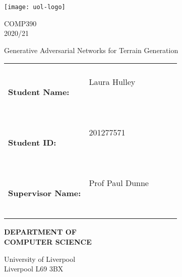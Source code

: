 \begin{titlepage}
    \begin{center}
        \texttt{[image: uol-logo]}

        \vspace{5em}

        \Large{COMP390}
        \vspace{1em}
        \Large{\\2020/21}

        \vspace{3em}

        \Large{Generative Adversarial Networks for Terrain Generation}

        \vspace{3em}

        \begin{tabular}{|lp{5.0cm}lll|}
            \hline
                                      &                    &  &   & \\
            \textbf{Student Name:}    & Laura Hulley

            \                         &                    &  &     \\
            \textbf{Student ID:}      & 201277571

            \                         &                    &  &     \\
            \textbf{Supervisor Name:} & Prof Paul Dunne

            \                         &                    &  &     \\
            \hline
        \end{tabular}

        \vspace{3em}

        \LARGE{{\textbf{DEPARTMENT OF\\
                        COMPUTER SCIENCE}}}

        \vspace{2em}

        University of Liverpool\\Liverpool L69 3BX

    \end{center}



\end{titlepage}